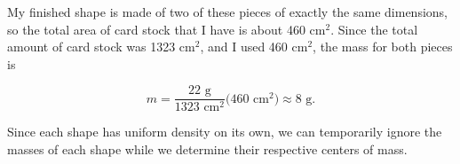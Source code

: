 \documentclass[12pt]{amsart}
\begin{document}
My finished shape is made of two of these pieces of exactly the same dimensions, so the total area of card stock that I have is about 460 cm$^2$. Since the total amount of card stock was 1323 cm$^2$, and I used 460 cm$^2$, the mass for both pieces is


$$m = \frac{22\text{ g}}{1323\text{ cm}^2}\big(460\text{ cm}^2\big) \approx 8\text{ g}.$$


Since each shape has uniform density on its own, we can temporarily ignore the masses of each shape while we determine their respective centers of mass.

\bigskip
\end{document}
